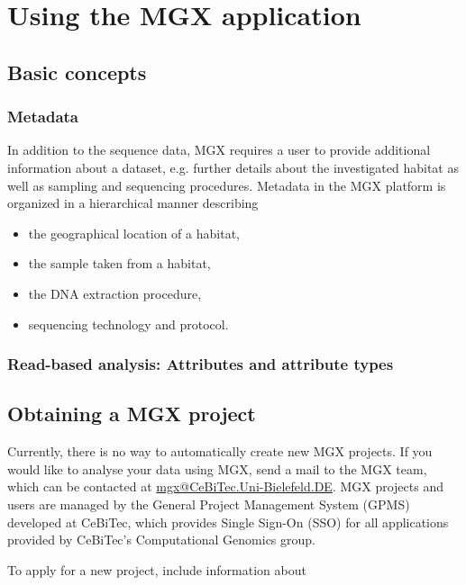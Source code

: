 
\chapter{Using the MGX application}
\label{using}

\section{Basic concepts}

\subsection{Metadata}

In addition to the sequence data, MGX requires a user to provide additional information
about a dataset, e.g. further details about the investigated habitat as well as sampling
and sequencing procedures. Metadata in the MGX platform is organized in a hierarchical
manner describing

\begin{itemize}
  \item the geographical location of a habitat,
  \item the sample taken from a habitat,
  \item the DNA extraction procedure,
  \item sequencing technology and protocol.
\end{itemize}

\subsection{Read-based analysis: Attributes and attribute types}

\section{Obtaining a MGX project}

Currently, there is no way to automatically create new MGX projects. If you would like to
analyse your data using MGX, send a mail to the MGX team, which can be contacted at 
\href{mailto:mgx@CeBiTec.Uni-Bielefeld.DE}{mgx@CeBiTec.Uni-Bielefeld.DE}. MGX projects
and users are managed by the General Project Management System (GPMS) developed at CeBiTec,
which provides Single Sign-On (SSO) for all applications provided by CeBiTec's Computational
Genomics group.

To apply for a new project, include information about


